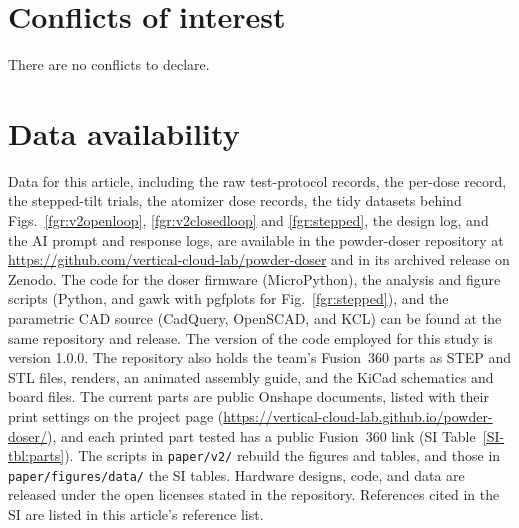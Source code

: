 \documentclass[twoside,twocolumn,9pt]{article}
\newcommand{\siref}[1]{\ref*{SI-#1}}
\begin{document}
\section*{Conflicts of interest}
There are no conflicts to declare.

\section*{Data availability}
Data for this article, including the raw test-protocol records, the per-dose record, the stepped-tilt trials, the atomizer dose records, the tidy datasets behind Figs.~\ref{fgr:v2openloop}, \ref{fgr:v2closedloop} and \ref{fgr:stepped}, the design log, and the AI prompt and response logs, are available in the powder-doser repository at \url{https://github.com/vertical-cloud-lab/powder-doser} and in its archived release on Zenodo.\cite{Charles2026Release} The code for the doser firmware (MicroPython), the analysis and figure scripts (Python, and gawk with pgfplots for Fig.~\ref{fgr:stepped}), and the parametric CAD source (CadQuery, OpenSCAD, and KCL) can be found at the same repository and release. The version of the code employed for this study is version 1.0.0. The repository also holds the team's Fusion~360 parts as STEP and STL files, renders, an animated assembly guide, and the KiCad schematics and board files. The current parts are public Onshape documents, listed with their print settings on the project page (\url{https://vertical-cloud-lab.github.io/powder-doser/}), and each printed part tested has a public Fusion~360 link (SI Table~\siref{tbl:parts}). The scripts in \texttt{paper/v2/} rebuild the figures and tables, and those in \texttt{paper/figures/data/} the SI tables. Hardware designs, code, and data are released under the open licenses stated in the repository. References cited in the SI are listed in this article's reference list.
\end{document}
